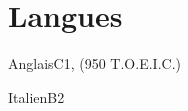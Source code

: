 \section{Langues}

\begin{factlist}
\item{Anglais}{C1, (950 T.O.E.I.C.)}
\item{Italien}{B2}
\end{factlist}